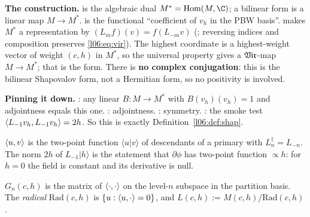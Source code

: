 \begin{dictionary}
\textbf{The construction.}  is the algebraic dual $M^* = \mathrm{Hom}(M,\C)$; a
bilinear form is a linear map $M\to M^*$.  is the functional ``coefficient of
$v_h$ in the PBW basis''.  makes $M^*$ a representation by $(L_m f)(v) = f(L_{-m}v)$
(; reversing indices and composition preserves \eqref{l06:eq:vir}). The highest
coordinate is a highest-weight vector of weight $(c,h)$ in $M^*$, so the universal property gives a
$\mathfrak{Vir}$-map $M\to M^*$; that is the form. There is \textbf{no complex conjugation}: this is the
bilinear Shapovalov form, not a Hermitian form, so no positivity is involved.

\textbf{Pinning it down.} \allowbreak{}: any linear $B:M\to M^*$ with
$B(v_h)(v_h) = 1$ and adjointness equals this one. : adjointness.
\allowbreak{}: symmetry. \allowbreak{}\allowbreak{}: the smoke test
$\langle L_{-1}v_h,L_{-1}v_h\rangle = 2h$. So this is exactly Definition~\ref{l06:def:shap}.
\end{dictionary}

\begin{physics}
$\langle u,v\rangle$ is the two-point function $\langle u|v\rangle$ of descendants of a primary with
$L_n^\dagger = L_{-n}$. The norm $2h$ of $L_{-1}|h\rangle$ is the statement that $\partial\phi$ has two-point
function $\propto h$: for $h = 0$ the field is constant and its derivative is null.
\end{physics}

\begin{definition}\label{l06:def:gramverma}
$G_n(c,h)$ is the matrix of $\langle \cdot,\cdot\rangle$ on the level-$n$ subspace in the partition basis. The
\emph{radical} $\mathrm{Rad}(c,h)$ is $\{u : \langle u,\cdot\rangle = 0\}$, and $L(c,h) := M(c,h)/\mathrm{Rad}(c,h)$.
\end{definition}

